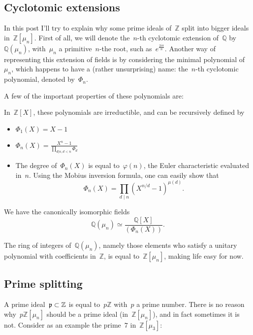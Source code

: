 \subsection{Cyclotomic extensions}

In this post I'll try to explain why some prime ideals of~${\mathbb{Z}}$ split into bigger ideals in~${\mathbb{Z}[\mu_n]}$. First of all, we will denote the~${n}$-th cyclotomic extension of~${\mathbb{Q}}$ by~${\mathbb{Q}(\mu_n)}$, with~${\mu_n}$ a primitive~${n}$-the root, such as~${e^{\frac{2i\pi}{n}}}$. Another way of representing this extension of fields is by considering the minimal polynomial of~${\mu_n}$, which happens to have a (rather unsurprising) name: the~${n}$-th cyclotomic polynomial, denoted by~${\Phi_n}$.

A few of the important properties of these polynomials are:

In~${\mathbb{Z}[X]}$, these polynomials are irreductible, and can be recursively defined by
\begin{itemize}
	\item $ \Phi_1(X) = X - 1~$
	\item $ \Phi_n(X) = \frac{X^n - 1}{\prod_{d|n, d < n}\Phi_d}~$
	\item The degree of~${\Phi_n(X)}$ is equal to~${\varphi(n)}$, the Euler characteristic evaluated in~${n}$. Using the Mobius inversion formula, one can easily show that
    \begin{equation}
      \Phi_n(X) = \prod_{d\mid n} \left( X^{n/d} - 1 \right)^{\mu(d)}  .
    \end{equation}
\end{itemize}

We have the canonically isomorphic fields
\begin{equation}
  \mathbb{Q}(\mu_n) \simeq \frac{\mathbb{Q}[X]}{(\Phi_n(X))} .
\end{equation}

The ring of integers of~${\mathbb{Q}(\mu_n)}$, namely those elements who satisfy a unitary polynomial with coefficients in~${\mathbb{Z}}$, is equal to~${\mathbb{Z}[\mu_n]}$, making life easy for now.

\subsection{Prime splitting}

A prime ideal~${\frak{p} \subset \mathbb{Z} }$ is equal to~${p\mathbb{Z}}$ with~${p}$ a prime number. There is no reason why~${p\mathbb{Z}[\mu_n]}$ should be a prime ideal (in~${\mathbb{Z}[\mu_n]}$), and in fact sometimes it is not. Consider as an example the prime~${7}$ in~${\mathbb{Z}[\mu_3]}$:

